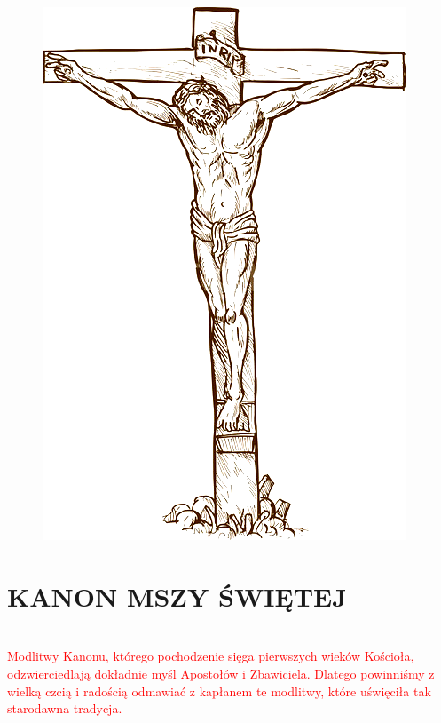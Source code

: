 \documentclass[12pt,titlepage]{book}
\newcommand{\rub}[1]{\textcolor{red}{\\#1}}
\newcommand*\cleartoleftpage{%
	\clearpage
	\ifodd\value{page}\hbox{}\newpage\fi
}
\begin{document}
	\cleartoleftpage
	\thispagestyle{empty}
	\begin{figure}[h]
		\includegraphics{cross.png}
	\end{figure}
	\cleardoublepage
	\section{KANON MSZY ŚWIĘTEJ}
	\rub{Modlitwy Kanonu, którego pochodzenie sięga pierwszych wieków Kościoła, odzwierciedlają dokładnie myśl Apostołów i Zbawiciela. Dlatego powinniśmy z wielką czcią i radością odmawiać z kapłanem te modlitwy, które uświęciła tak starodawna tradycja.}
	
\end{document}
